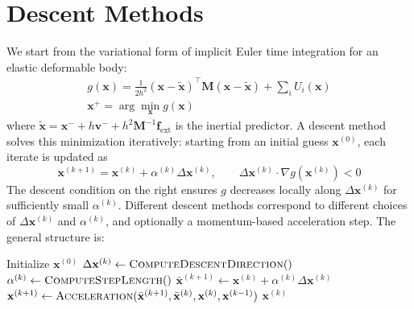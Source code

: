 \documentclass{article}
\begin{document}
\newpage

\section{Descent Methods \cite{wang2016descent}}
\label{sec:descent_methods}

We start from the variational form of implicit Euler time integration for an elastic deformable body:
\begin{equation}
\begin{gathered}
    g(\mathbf{x}) = \frac{1}{2h^2}(\mathbf{x} - \tilde{\mathbf{x}})^\top \mathbf{M} (\mathbf{x} - \tilde{\mathbf{x}}) + \sum_i U_i(\mathbf{x}) \\[1ex]
    \mathbf{x}^+ = \arg\min_{\mathbf{x}} g(\mathbf{x})
\end{gathered}
\end{equation}
where $\tilde{\mathbf{x}} = \mathbf{x}^- + h\mathbf{v}^- + h^2\mathbf{M}^{-1}\mathbf{f}_{\text{ext}}$ is the inertial predictor. A descent method solves this minimization iteratively: starting from an initial guess $\mathbf{x}^{(0)}$, each iterate is updated as
\begin{equation}
    \mathbf{x}^{(k+1)} = \mathbf{x}^{(k)} + \alpha^{(k)} \Delta\mathbf{x}^{(k)}, 
    \qquad
    \Delta\mathbf{x}^{(k)} \cdot \nabla g(\mathbf{x}^{(k)}) < 0
\end{equation}
The descent condition on the right ensures $g$ decreases locally along $\Delta\mathbf{x}^{(k)}$ for sufficiently small $\alpha^{(k)}$. Different descent methods correspond to different choices of $\Delta\mathbf{x}^{(k)}$ and $\alpha^{(k)}$, and optionally a momentum-based acceleration step. The general structure is:

\begin{algorithm}[H]
\label{alg:descent_timestep}
\caption{General Descent Method Time Step}
\begin{algorithmic}[1]
    \State Initialize $\mathbf{x}^{(0)}$
        \State $\Delta\mathbf{x}^{(k)} \gets \textsc{ComputeDescentDirection}()$
        \State $\alpha^{(k)} \gets \textsc{ComputeStepLength}()$
        \State $\bar{\mathbf{x}}^{(k+1)} \gets \mathbf{x}^{(k)} + \alpha^{(k)}\Delta\mathbf{x}^{(k)}$
        \State $\mathbf{x}^{(k+1)} \gets \textsc{Acceleration}(\bar{\mathbf{x}}^{(k+1)}, \bar{\mathbf{x}}^{(k)}, \mathbf{x}^{(k)}, \mathbf{x}^{(k-1)})$
    \EndFor
    \State \Return $\mathbf{x}^{(k)}$
\EndFunction
\end{algorithmic}
\end{algorithm}
\end{document}
